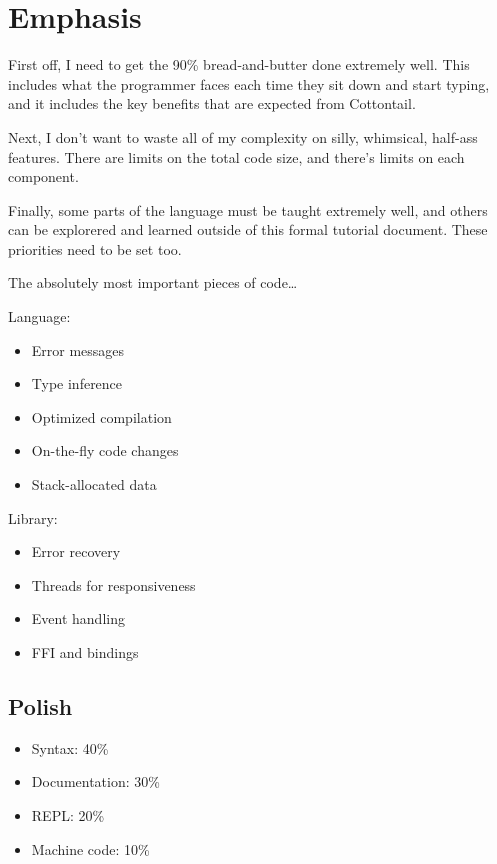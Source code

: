 \chapter{Emphasis}

First off, I need to get the 90\% bread-and-butter done extremely
well. This includes what the programmer faces each time they sit down
and start typing, and it includes the key benefits that are expected
from Cottontail.

Next, I don't want to waste all of my complexity on silly, whimsical,
half-ass features. There are limits on the total code size, and
there's limits on each component.

Finally, some parts of the language must be taught extremely well, and
others can be explorered and learned outside of this formal tutorial
document. These priorities need to be set too.

The absolutely most important pieces of code\ldots{}

Language:

\begin{itemize}
\item Error messages
\item Type inference
\item Optimized compilation
\item On-the-fly code changes
\item Stack-allocated data
\end{itemize}

Library:

\begin{itemize}
\item Error recovery
\item Threads for responsiveness
\item Event handling
\item FFI and bindings
\end{itemize}

\section{Polish}

\begin{itemize}
\item Syntax:             40\%
\item Documentation:      30\%
\item REPL:               20\%
\item Machine code:       10\%
\end{itemize}


